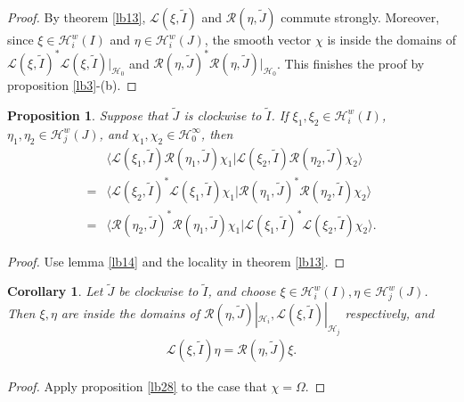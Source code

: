 \documentclass[11pt,b5paper,notitlepage]{article}
\theoremstyle{definition}
\theoremstyle{plain}
\newtheorem{pp}[df]{Proposition}
\newtheorem{co}[df]{Corollary}
\newcommand{\mc}{\mathcal}
\newcommand{\wtd}{\widetilde}
\newcommand{\bk}[1]{\langle {#1}\rangle}
\newcommand{\scr}{\mathscr}
\numberwithin{equation}{subsection}
\begin{document}
\begin{proof}
By theorem \ref{lb13}, $\scr L(\xi,\wtd I)$ and $\scr R(\eta,\wtd J)$ commute strongly. Moreover, since $\xi\in\mc H_i^w(I)$ and $\eta\in\mc H_i^w(J)$, the smooth vector $\chi$ is inside the domains of $\scr L(\xi,\wtd I)^*\scr L(\xi,\wtd I)|_{\mc H_0}$ and $\scr R(\eta,\wtd J)^*\scr R(\eta,\wtd J)|_{\mc H_0}$. This finishes the proof by proposition \ref{lb3}-(b).
\end{proof}


\begin{pp}\label{lb26}
	Suppose that $\wtd J$ is clockwise to $\wtd I$. If $\xi_1,\xi_2\in\mc H_i^w(I)$, $\eta_1,\eta_2\in\mc H_j^w(J)$, and $\chi_1,\chi_2\in\mc H_0^\infty$, then 
	\begin{align}
	&\bk{\scr L(\xi_1,\wtd I)\scr R(\eta_1,\wtd J)\chi_1|\scr L(\xi_2,\wtd I)\scr R(\eta_2,\wtd J)\chi_2}\nonumber\\
	=&\bk{\scr L(\xi_2,\wtd I)^*\scr L(\xi_1,\wtd I)\chi_1|\scr R(\eta_1,\wtd J)^*\scr R(\eta_2,\wtd I)\chi_2}\nonumber\\
	=&\bk{\scr R(\eta_2,\wtd J)^*\scr R(\eta_1,\wtd J)\chi_1|\scr L(\xi_1,\wtd I)^*\scr L(\xi_2,\wtd I)\chi_2}.
	\end{align}
\end{pp}

\begin{proof}
	Use lemma \ref{lb14} and the locality in theorem \ref{lb13}.
\end{proof}

\begin{co}\label{lb75}
Let $\wtd J$ be clockwise to $\wtd I$, and choose $\xi\in\mc H_i^w(I),\eta\in\mc H_j^w(J)$. Then $\xi,\eta$ are inside the domains of $\scr R(\eta,\wtd J)|_{\mc H_i},\scr L(\xi,\wtd I)|_{\mc H_j}$ respectively, and
\begin{align}\label{eq18}
\scr L(\xi,\wtd I)\eta=\scr R(\eta,\wtd J)\xi.
\end{align}
\end{co}
\begin{proof}
Apply proposition \ref{lb28} to the case that  $\chi=\Omega$.
\end{proof}
\end{document}
